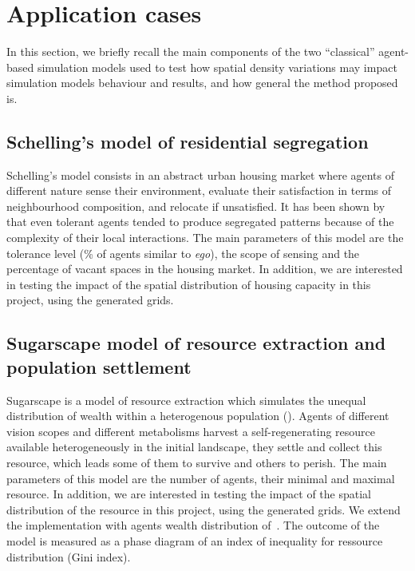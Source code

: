 \documentclass[Afour,sageh,times]{sagej}
\begin{document}
\section{Application cases}

In this section, we briefly recall the main components of the two ``classical'' agent-based simulation models used to test how spatial density variations may impact simulation models behaviour and results, and how general the method proposed is.

\subsection{Schelling's model of residential segregation}

Schelling's model consists in an abstract urban housing market where agents of different nature sense their environment, evaluate their satisfaction in terms of neighbourhood composition, and relocate if unsatisfied. It has been shown by \cite{Schelling1969} that even tolerant agents tended to produce segregated patterns because of the complexity of their local interactions. The main parameters of this model are the tolerance level (\% of agents similar to {\it ego}), the scope of sensing and the percentage of vacant spaces in the housing market. In addition, we are interested in testing the impact of the spatial distribution of housing capacity in this project, using the generated grids. 

\subsection{Sugarscape model of resource extraction and population settlement}

Sugarscape is a model of resource extraction which simulates the unequal distribution of wealth within a heterogenous population (\cite{EpsteinAxtell1996}). Agents of different vision scopes and different metabolisms harvest a self-regenerating resource available heterogeneously in the initial landscape, they settle and collect this resource, which leads some of them to survive and others to perish. The main parameters of this model are the number of agents, their minimal and maximal resource. In addition, we are interested in testing the impact of the spatial distribution of the resource in this project, using the generated grids. We extend the implementation with agents wealth distribution of~\cite{li2009netlogo}. The outcome of the model is measured as a phase diagram of an index of inequality for ressource distribution (Gini index). 
\end{document}

